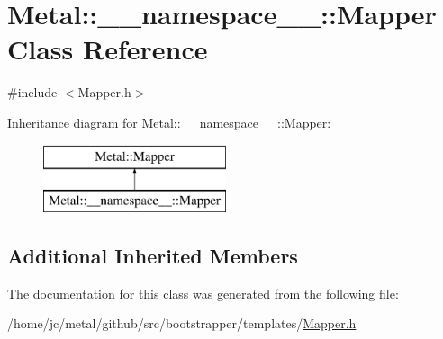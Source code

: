\hypertarget{classMetal_1_1____namespace_____1_1Mapper}{}\section{Metal\+:\+:\+\_\+\+\_\+namespace\+\_\+\+\_\+\+:\+:Mapper Class Reference}
\label{classMetal_1_1____namespace_____1_1Mapper}


{\ttfamily \#include $<$Mapper.\+h$>$}

Inheritance diagram for Metal\+:\+:\+\_\+\+\_\+namespace\+\_\+\+\_\+\+:\+:Mapper\+:\begin{figure}[H]
\begin{center}
\leavevmode
\includegraphics[height=2.000000cm]{classMetal_1_1____namespace_____1_1Mapper}
\end{center}
\end{figure}
\subsection*{Additional Inherited Members}


The documentation for this class was generated from the following file\+:\begin{DoxyCompactItemize}
\item 
/home/jc/metal/github/src/bootstrapper/templates/\hyperlink{src_2bootstrapper_2templates_2Mapper_8h}{Mapper.\+h}\end{DoxyCompactItemize}
